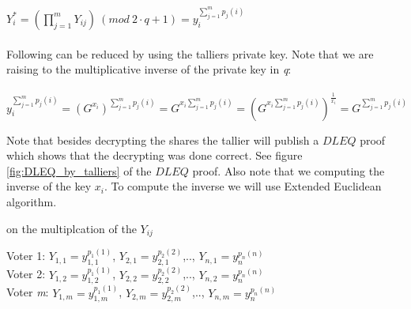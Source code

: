 \begin{infobox}
\begin{math}Y_i^*=(\prod\limits_{j=1}^{m} Y_{ij}) \ (mod\ 2 \cdot q+1) =y_i^{\sum\limits_{j=1}^m p_j(i)}\end{math}\\ \\
Following can be reduced by using the talliers private key. Note that we are raising to the multiplicative inverse of the private key in  \textit{q}:\\\\
\begin{math}y_i^{\sum\limits_{j=1}^m p_j(i)}=(G^{x_i})^{\sum\limits_{j=1}^m p_j(i)} = G^{x_i \sum\limits_{j=1}^m p_j(i)}= (G^{x_i \sum\limits_{j=1}^m p_j(i)})^{\frac{1}{x_i}}= G^{ \sum\limits_{j=1}^m p_j(i)}   \end{math}
\end{infobox}


\noindent
Note that besides decrypting the shares the tallier will publish a $DLEQ$ proof which shows that the decrypting was done correct. See figure \ref{fig:DLEQ_by_talliers} of the $DLEQ$ proof. Also note that we computing the inverse of the key $x_i$. To compute the inverse we will use Extended Euclidean algorithm.

 on the multiplcation of the $Y_{ij}$
\begin{center}
Voter 1: \begin{math}Y_{1,1}=y_{1,1}^{p_1(1)} \end{math}, \begin{math}Y_{2,1}=y_{2,1}^{p_2(2)} \end{math},.., \begin{math}Y_{n,1}=y_n^{p_n(n)} \end{math}\\
Voter 2: \begin{math}Y_{1,2}=y_{1,2}^{p_1(1)} \end{math}, \begin{math}Y_{2,2}=y_{2,2}^{p_2(2)} \end{math},.., \begin{math}Y_{n,2}=y_n^{p_n(n)} \end{math}\\
Voter \textit{m}: \begin{math}Y_{1,m}=y_{1,m}^{p_1(1)} \end{math}, \begin{math}Y_{2,m}=y_{2,m}^{p_2(2)} \end{math},.., \begin{math}Y_{n,m}=y_n^{p_n(n)} \end{math}\\
\end{center}

